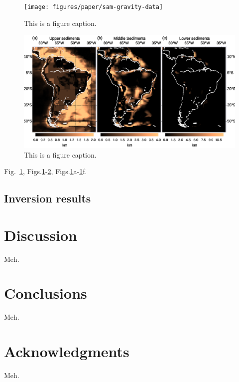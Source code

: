 \documentclass[extra]{gji}
\newcommand{\fig}[1]{Fig.~\ref{fig:#1}}
\newcommand{\figs}[2]{Figs.\ref{fig:#1}-\ref{fig:#2}}
\newcommand{\subfigs}[3]{Figs.\ref{fig:#1}#2-\ref{fig:#1}#3}
\begin{document}
\begin{figure}
    \centering
    \texttt{[image: figures/paper/sam-gravity-data]}
    \caption{This is a figure caption.}
    \label{fig:sam-data}
\end{figure}

\begin{figure}
    \centering
    \includegraphics[width=\textwidth]{figures/paper/sam-gravity-sed}
    \caption{This is a figure caption.}
    \label{fig:sam-sed}
\end{figure}

\fig{sam-data}, \figs{sam-data}{sam-sed}, \subfigs{sam-data}{a}{f}.

\subsection{Inversion results}

\section{Discussion}

Meh.

\section{Conclusions}

Meh.

\section{Acknowledgments}

Meh.



\end{document}
